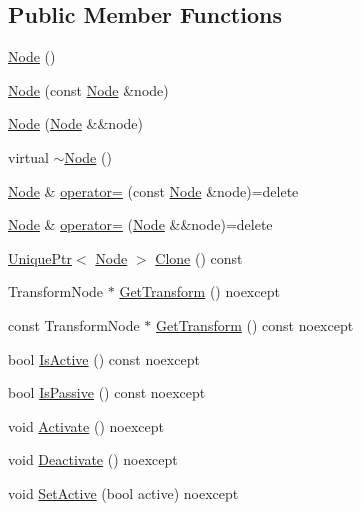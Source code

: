 \subsection*{Public Member Functions}
\begin{DoxyCompactItemize}
\item 
\hyperlink{classmage_1_1_node_a58b816eaa1dfd3c4b7f14896f190587f}{Node} ()
\item 
\hyperlink{classmage_1_1_node_af9da591163469f210895f3a5b389d7cc}{Node} (const \hyperlink{classmage_1_1_node}{Node} \&node)
\item 
\hyperlink{classmage_1_1_node_adbc40b6c4100f74faa2b59a7a0b79388}{Node} (\hyperlink{classmage_1_1_node}{Node} \&\&node)
\item 
virtual \hyperlink{classmage_1_1_node_a1369fc11b331abacbaf11aeb5729e871}{$\sim$\+Node} ()
\item 
\hyperlink{classmage_1_1_node}{Node} \& \hyperlink{classmage_1_1_node_ad10ea13608963acfa06d3c1577314da5}{operator=} (const \hyperlink{classmage_1_1_node}{Node} \&node)=delete
\item 
\hyperlink{classmage_1_1_node}{Node} \& \hyperlink{classmage_1_1_node_a007043de35c65edb9a0d790824186151}{operator=} (\hyperlink{classmage_1_1_node}{Node} \&\&node)=delete
\item 
\hyperlink{namespacemage_a3316d7143a973e37adf1110f2e80ca31}{Unique\+Ptr}$<$ \hyperlink{classmage_1_1_node}{Node} $>$ \hyperlink{classmage_1_1_node_a18e08151571435d319be2414474c93c0}{Clone} () const
\item 
Transform\+Node $\ast$ \hyperlink{classmage_1_1_node_ab789d7674ed06d3e10114dd6d4b4334c}{Get\+Transform} () noexcept
\item 
const Transform\+Node $\ast$ \hyperlink{classmage_1_1_node_acbffccfec34313d8583546204c3d9fda}{Get\+Transform} () const noexcept
\item 
bool \hyperlink{classmage_1_1_node_a6fce6afdcfdde0e5dff5b219cee4f372}{Is\+Active} () const noexcept
\item 
bool \hyperlink{classmage_1_1_node_a5fb6ac39c7e0d630944594cd5426f61a}{Is\+Passive} () const noexcept
\item 
void \hyperlink{classmage_1_1_node_aefa62a09afd2b0d314a64e6d45f45a34}{Activate} () noexcept
\item 
void \hyperlink{classmage_1_1_node_afb4de0bc346a435745facfbdeda4ac6a}{Deactivate} () noexcept
\item 
void \hyperlink{classmage_1_1_node_af123050daa89e50f5468b630061aae53}{Set\+Active} (bool active) noexcept

\end{DoxyCompactItemize}
